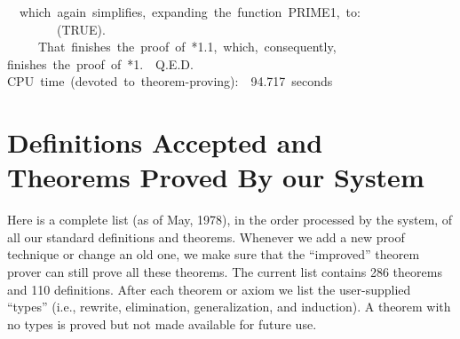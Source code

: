 \documentclass[11pt]{book}
\newenvironment{pubasis}{\begin{flushleft}\ttfamily\small}{\normalsize\rmfamily\end{flushleft}}
\newcommand{\pubdefaulttextsize}{\large}
\begin{document}
\begin{pubasis}
~~which~again~simplifies,~expanding~the~function~PRIME1,~to:\\

~~~~~~~~(TRUE).\\

~~~~~That~finishes~the~proof~of~*1.1,~which,~consequently,\\
finishes~the~proof~of~*1.~~Q.E.D.\\

CPU~time~(devoted~to~theorem-proving):~~94.717~seconds\\
\end{pubasis}
\appendix
\chapter{Definitions Accepted and Theorems Proved By our System}
\label{APPTHMS}
\pubdefaulttextsize
Here is a complete list (as of May, 1978), in the order processed by
the system, of all our standard definitions and theorems.
Whenever we add a new proof technique or change an old one, we
make sure that the ``improved'' theorem prover can still prove all
these theorems.  The current list contains 286 theorems and 110 definitions.
After each theorem or axiom
we list the user-supplied ``types'' (i.e., rewrite, elimination,
generalization, and induction).  A theorem with no types
is proved but not made available for future use.
\end{document}
